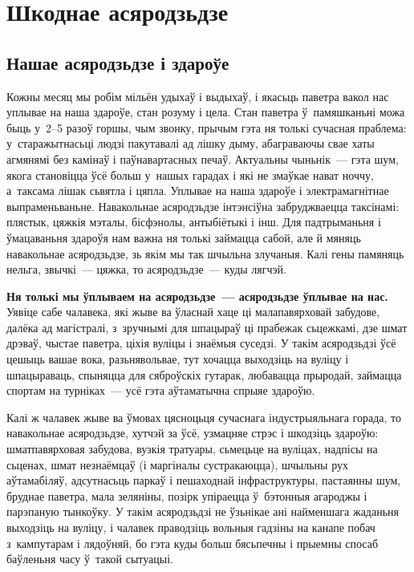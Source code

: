 \chapter{Шкоднае асяродзьдзе}

\section{Нашае асяродзьдзе і здароўе}

Кожны месяц мы робім мільён удыхаў і выдыхаў, і якасьць паветра вакол нас уплывае на наша здароўе, стан розуму і цела. Стан паветра ў~памяшканьні можа быць у~2--5 разоў горшы, чым звонку, прычым гэта ня толькі сучасная праблема: у~старажытнасьці людзі пакутавалі ад лішку дыму, абаграваючы свае хаты агмянямі без камінаў і паўнавартасных печаў. Актуальны чыньнік~--- гэта шум, якога становіцца ўсё больш у~нашых гарадах і які не змаўкае нават ноччу, а~таксама лішак сьвятла і цяпла. Уплывае на наша здароўе і электрамагнітнае выпраменьваньне. Навакольнае асяродзьдзе інтэнсіўна забруджваецца таксінамі: плястык, цяжкія мэталы, бісфэнолы, антыбіётыкі і інш. Для падтрыманьня і ўмацаваньня здароўя нам важна ня толькі займацца сабой, але й мяняць навакольнае асяродзьдзе, зь якім мы так шчыльна злучаныя. Калі гены памяняць нельга, звычкі~--- цяжка, то асяродзьдзе~--- куды лягчэй.

\textbf{Ня толькі мы ўплываем на асяродзьдзе~--- асяродзьдзе ўплывае на нас.} Уявіце сабе чалавека, які жыве ва ўласнай хаце ці малапавярховай забудове, далёка ад магістралі, з~зручнымі для шпацыраў ці прабежак сьцежкамі, дзе шмат дрэваў, чыстае паветра, ціхія вуліцы і знаёмыя суседзі. У такім асяродзьдзі ўсё цешыць вашае вока, разьнявольвае, тут хочацца выходзіць на вуліцу і шпацыраваць, спыняцца для сяброўскіх гутарак, любавацца прыродай, займацца спортам на турніках~--- усё гэта аўтаматычна спрыяе здароўю.

Калі ж чалавек жыве ва ўмовах цясноцьця сучаснага індустрыяльнага горада, то навакольнае асяродзьдзе, хутчэй за ўсё, узмацняе стрэс і шкодзіць здароўю: шматпавярховая забудова, вузкія тратуары, сьмецьце на вуліцах, надпісы на сьценах, шмат незнаёмцаў (і маргіналы сустракаюцца), шчыльны рух аўтамабіляў, адсутнасьць паркаў і пешаходнай інфраструктуры, пастаянны шум, бруднае паветра, мала зеляніны, позірк упіраецца ў~бэтонныя агароджы і парэпаную тынкоўку. У такім асяродзьдзі не ўзьнікае ані найменшага жаданьня выходзіць на вуліцу, і чалавек праводзіць вольныя гадзіны на канапе побач з~кампутарам і лядоўняй, бо гэта куды больш бясьпечны і прыемны спосаб баўленьня часу ў~такой сытуацыі.

